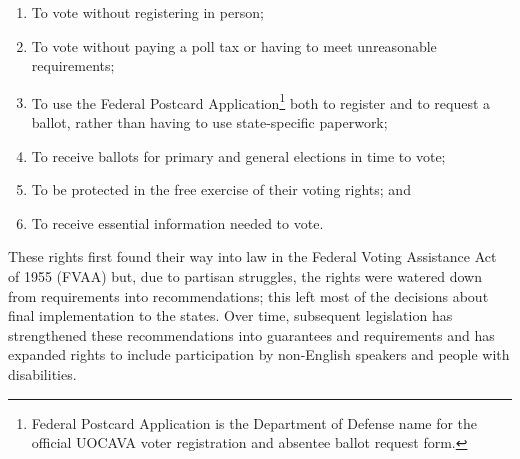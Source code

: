 \begin{enumerate}
  \item To vote without registering in person;
  \item To vote without paying a poll tax or having to meet
    unreasonable requirements;
  \item To use the Federal Postcard Application\footnote{Federal
      Postcard Application is the Department of Defense name for the
      official UOCAVA voter registration and absentee ballot request
      form.} both to register and to request a ballot, rather than
    having to use state-specific paperwork;
  \item To receive ballots for primary and general elections in time to vote;
  \item To be protected in the free exercise of their voting rights;
    and 
  \item To receive essential information needed to vote.
\end{enumerate}

These rights first found their way into law in the Federal Voting
Assistance Act of 1955 (FVAA) but, due to partisan struggles, the
rights were watered down from requirements into recommendations; this
left most of the decisions about final implementation to the
states. Over time, subsequent legislation has strengthened these
recommendations into guarantees and requirements and has expanded
rights to include participation by non-English speakers and people
with disabilities.





